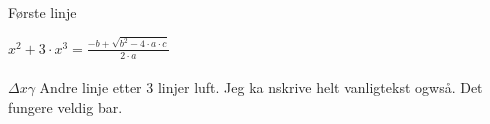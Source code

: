 \documentclass{article}
\newcommand{\nl}[1][1]{%
  \par
  \vspace*{#1\baselineskip}%
  \noindent
}
\begin{document}
Første linje
\nl[3]
$x^2+3\cdot x^3=\frac{-b+\sqrt{b^2-4\cdot a\cdot c}}{2\cdot a}$\\\\
$\Delta x \gamma $
Andre linje etter 3 linjer luft. Jeg ka nskrive helt vanligtekst ogwså. Det fungere veldig bar.\newpage
\end{document}
